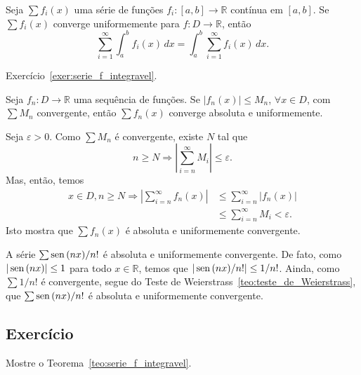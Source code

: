 \begin{teo}\label{teo:serie_f_integravel}
  Seja $\sum f_i(x)$ uma série de funções $f_i:[a, b]\to\mathbb{R}$ contínua em $[a, b]$. Se $\sum f_i(x)$ converge uniformemente para $f:D\to\mathbb{R}$, então
  \begin{equation}
    \sum_{i=1}^\infty \int_a^b f_i(x)\,dx = \int_a^b \sum_{i=1}^\infty f_i(x)\,dx.
  \end{equation}
\end{teo}
\begin{dem}
  Exercício~\ref{exer:serie_f_integravel}.
\end{dem}

\begin{teo}\label{teo:teste_de_Weierstrass}
  Seja $f_n:D\to\mathbb{R}$ uma sequência de funções. Se $|f_n(x)|\leq M_n$, $\forall x\in D$, com $\sum M_n$ convergente, então $\sum f_n(x)$ converge absoluta e uniformemente.
\end{teo}
\begin{dem}
  Seja $\varepsilon>0$. Como $\sum M_n$ é convergente, existe $N$ tal que
  \begin{equation}
    n\geq N \Rightarrow \left|\sum_{i=n}^\infty M_i\right|\leq \varepsilon.
  \end{equation}
Mas, então, temos
\begin{align}
  x\in D, n\geq N \Rightarrow \left|\sum_{i=n}^\infty f_n(x)\right| &\leq \sum_{i=n}^\infty |f_n(x)|\\
  &\leq \sum_{i=n}^\infty M_i < \varepsilon.
\end{align}
Isto mostra que $\sum f_n(x)$ é absoluta e uniformemente convergente.
\end{dem}

\begin{ex}
  A série $\sum \operatorname{sen}\,(nx)/n!$ é absoluta e uniformemente convergente. De fato, como $|\operatorname{sen}\,(nx)|\leq 1$ para todo $x\in \mathbb{R}$, temos que $|\operatorname{sen}\,(nx)/n!|\leq 1/n!$. Ainda, como $\sum 1/n!$ é convergente, segue do Teste de Weierstrass~\ref{teo:teste_de_Weierstrass}, que $\sum \operatorname{sen}\,(nx)/n!$ é absoluta e uniformemente convergente.
\end{ex}

\subsection*{Exercício}

\begin{exer}\label{exer:serie_f_integravel}
  Mostre o Teorema~\ref{teo:serie_f_integravel}.
\end{exer}

